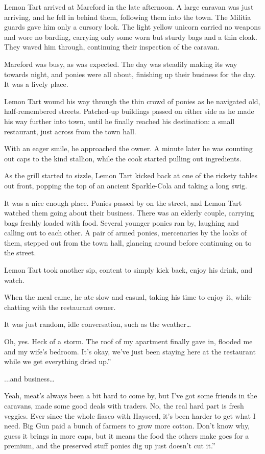 Lemon Tart arrived at Mareford in the late afternoon. A large caravan was just arriving, and he fell in behind them, following them into the town. The Militia guards gave him only a cursory look. The light yellow unicorn carried no weapons and wore no barding, carrying only some worn but sturdy bags and a thin cloak. They waved him through, continuing their inspection of the caravan.

Mareford was busy, as was expected. The day was steadily making its way towards night, and ponies were all about, finishing up their business for the day. It was a lively place.

Lemon Tart wound his way through the thin crowd of ponies as he navigated old, half-remembered streets. Patched-up buildings passed on either side as he made his way further into town, until he finally reached his destination: a small restaurant, just across from the town hall.

With an eager smile, he approached the owner. A minute later he was counting out caps to the kind stallion, while the cook started pulling out ingredients.

As the grill started to sizzle, Lemon Tart kicked back at one of the rickety tables out front, popping the top of an ancient Sparkle-Cola and taking a long swig.

It was a nice enough place. Ponies passed by on the street, and Lemon Tart watched them going about their business. There was an elderly couple, carrying bags freshly loaded with food. Several younger ponies ran by, laughing and calling out to each other. A pair of armed ponies, mercenaries by the looks of them, stepped out from the town hall, glancing around before continuing on to the street.

Lemon Tart took another sip, content to simply kick back, enjoy his drink, and watch.

When the meal came, he ate slow and casual, taking his time to enjoy it, while chatting with the restaurant owner.

It was just random, idle conversation, such as the weather…

\leavevmode{}Oh, yes. Heck of a storm. The roof of my apartment finally gave in, flooded me and my wife’s bedroom. It’s okay, we’ve just been staying here at the restaurant while we get everything dried up.”

...and business…

\leavevmode{}Yeah, meat’s always been a bit hard to come by, but I’ve got some friends in the caravans, made some good deals with traders. No, the real hard part is fresh veggies. Ever since the whole fiasco with Hayseed, it’s been harder to get what I need. Big Gun paid a bunch of farmers to grow more cotton. Don’t know why, guess it brings in more caps, but it means the food the others make goes for a premium, and the preserved stuff ponies dig up just doesn’t cut it.”

